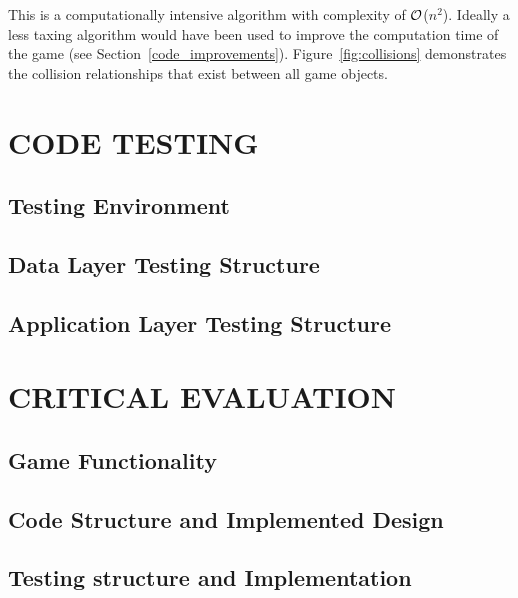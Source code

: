 \documentclass[10pt,twocolumn]{witseiepaper}
\begin{document}
This is a computationally intensive algorithm with complexity of $\cal{O}$($n^{2}$). Ideally a less taxing algorithm would have been used to improve the computation time of the game (see Section~\ref{code_improvements}). Figure~\ref{fig:collisions} demonstrates the collision relationships that exist between all game objects.


\section{CODE TESTING}

\subsection{Testing Environment}

\subsection{Data Layer Testing Structure}

\subsection{Application Layer Testing Structure}

\section{CRITICAL EVALUATION}

\subsection{Game Functionality}

\subsection{Code Structure and Implemented Design}

\subsection{Testing structure and Implementation}
\end{document}
